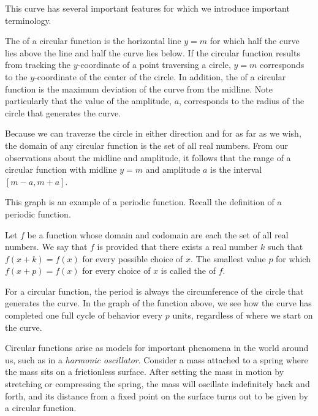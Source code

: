 \documentclass[nooutcomes, noauthor]{ximera}
\begin{document}
This curve has several important features for which we introduce important terminology.%

\begin{definition}
The   of a circular function is the horizontal line \(y = m\) for which half the curve lies above the line and half the curve lies below.  If the circular function results from tracking the \(y\)-coordinate of a point traversing a circle, \(y = m\) corresponds to the \(y\)-coordinate of the center of the circle.  In addition, the   of a circular function is the maximum deviation of the curve from the midline.  Note particularly that the value of the amplitude, \(a\), corresponds to the radius of the circle that generates the curve.%

Because we can traverse the circle in either direction and for as far as we wish, the domain of any circular function is the set of all real numbers.  From our observations about the midline and amplitude, it follows that the range of a circular function  with midline \(y = m\) and amplitude \(a\) is the interval \([m-a,m+a]\).
\end{definition}

This graph is an example of a periodic function.  Recall the definition of a periodic function.

\begin{definition}
Let \(f\) be a function whose domain and codomain are each the set of all real numbers.  We say that \(f\) is  provided that there exists a real number \(k\) such that \(f(x+k) = f(x)\) for every possible choice of \(x\).  The smallest value \(p\) for which \(f(x+p) = f(x)\) for every choice of \(x\) is called the  of \(f\).%
\end{definition}

For a circular function, the period is always the circumference of the circle that generates the curve.  In the graph of the function above, we see how the curve has completed one full cycle of behavior every \(p\) units, regardless of where we start on the curve.%

Circular functions arise as models for important phenomena in the world around us, such as in a \emph{harmonic oscillator}.   Consider a mass attached to a spring where the mass sits on a frictionless surface.  After setting the mass in motion by stretching or compressing the spring, the mass will oscillate indefinitely back and forth, and its distance from a fixed point on the surface turns out to be given by a circular function.%
\end{document}

